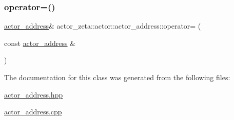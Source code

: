 \subsubsection{\texorpdfstring{operator=()}{operator=()}\hspace{0.1cm}{\footnotesize\ttfamily [2/2]}}
{\footnotesize\ttfamily \hyperlink{classactor__zeta_1_1actor_1_1actor__address}{actor\+\_\+address}\& actor\+\_\+zeta\+::actor\+::actor\+\_\+address\+::operator= (\begin{DoxyParamCaption}\item[{const \hyperlink{classactor__zeta_1_1actor_1_1actor__address}{actor\+\_\+address} \&}]{ }\end{DoxyParamCaption})\hspace{0.3cm}{\ttfamily [default]}}



The documentation for this class was generated from the following files\+:\begin{DoxyCompactItemize}
\item 
\hyperlink{actor__address_8hpp}{actor\+\_\+address.\+hpp}\item 
\hyperlink{actor__address_8cpp}{actor\+\_\+address.\+cpp}\end{DoxyCompactItemize}
